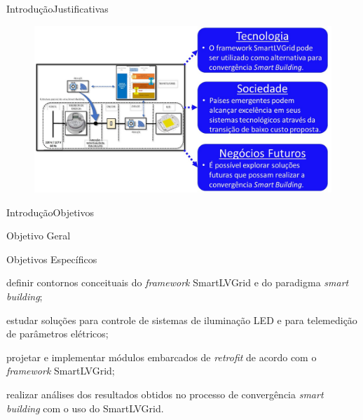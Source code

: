 \begin{frame}{Introdução}{Justificativas}
	\vspace{-0.64cm}
	\begin{figure}[htp]
		\centering
		\caption{}
		\includegraphics[width=0.97\linewidth]{img/6.jpg}
		\hspace{5cm}
		\vspace{5cm}
	\end{figure}
	
\end{frame}

\begin{frame}{Introdução}{Objetivos}
	\begin{block}{Objetivo Geral}
	\end{block}
	
	\begin{block}{Objetivos Específicos}
		\begin{itemize}
			\small{	\item definir contornos conceituais do \textit{framework} SmartLVGrid e do paradigma \textit{smart building};
				\item estudar soluções para controle de sistemas de iluminação LED e para telemedição de parâmetros elétricos;
				\item projetar e implementar módulos embarcados de \textit{retrofit} de acordo com o \textit{framework} SmartLVGrid;
				\item realizar análises dos resultados obtidos no processo de convergência \textit{smart building} com o uso do SmartLVGrid.}
		\end{itemize}
	\end{block}
\end{frame}


